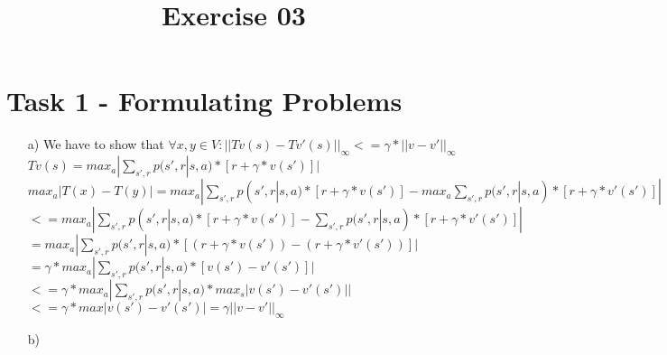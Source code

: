 \documentclass[a4paper]{article}
\date{}
\author{}
\title{\textbf{Exercise 03}}
\begin{document}
	\maketitle 
	\thispagestyle{fancy}
	
    \section*{Task 1 - Formulating Problems}
    \begin{itemize}
    	\item[a)] We have to show that $\forall x,y\in V: ||Tv(s)-Tv'(s)||_{\infty} <= \gamma*||v-v'||_{\infty}$ \\
    	$Tv(s) = max_a |\sum_{s',r} p(s',r|s,a)*[r+\gamma*v(s')]|$ \\
    	$max_a|T(x)-T(y)| = max_a |\sum_{s',r} p(s',r|s,a)*[r+\gamma*v(s')] - max_a \sum_{s',r} p(s',r|s,a)*[r+\gamma*v'(s')]|$ \\
    	$<= max_a |\sum_{s',r} p(s',r|s,a)*[r+\gamma*v(s')]-\sum_{s',r} p(s',r|s,a)*[r+\gamma*v'(s')]| $ \\
    	$= max_a |\sum_{s',r} p(s',r|s,a)*[(r+\gamma*v(s'))-(r+\gamma*v'(s'))]|$ \\
    	$= \gamma*max_a |\sum_{s',r} p(s',r|s,a)*[v(s')-v'(s')]|$ \\
    	$<= \gamma*max_a|\sum_{s',r} p(s',r|s,a)*max_s|v(s')-v'(s')||$ \\
    	$<= \gamma*max|v(s')-v'(s')| = \gamma||v-v'||_{\infty}$
    	\item[b)]
    \end{itemize}
\end{document}
